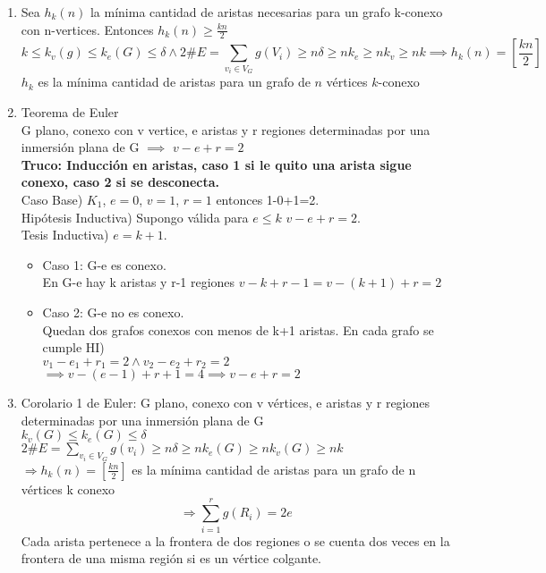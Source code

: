 \documentclass{article}
\begin{document}
\begin{enumerate}
    \item Sea $h_k(n)$ la mínima cantidad de aristas necesarias para un grafo k-conexo con n-vertices. Entonces $h_k(n)\geq\frac{kn}{2}$ \\
    $$k\leq k_v(g)\leq k_e(G)\leq\delta \land 2\#E=\sum_{v_i\in V_G}g(V_i)\geq n\delta\geq nk_e\geq nk_v\geq nk \implies h_k(n)=\left[\frac{kn}{2}\right]$$
    $h_k$ es la mínima cantidad de aristas para un grafo de $n$ vértices $k$-conexo
    
    \item Teorema de Euler \\
    G plano, conexo con v vertice, e aristas y r regiones determinadas por una inmersión plana de G $\implies$ $v-e+r=2$ \\
    \textbf{Truco: Inducción en aristas, caso 1 si le quito una arista sigue conexo, caso 2 si se desconecta.} \\
    Caso Base) $K_1$, $e=0$, $v=1$, $r=1$ entonces 1-0+1=2. \\
    Hipótesis Inductiva) Supongo válida para $e\leq k$ $v - e + r = 2$. \\
    Tesis Inductiva) $e=k+1$. 
    \begin{itemize}
        \item Caso 1: G-e es conexo. \\
    En G-e hay k aristas y r-1 regiones $v - k + r - 1 = v - (k + 1) + r = 2$
        \item Caso 2: G-e no es conexo. \\
    Quedan dos grafos conexos con menos de k+1 aristas. En cada grafo se cumple HI) \\
    $v_1 - e_1 + r_1 = 2 \land v_2 - e_2 + r_2 = 2$ \\
    $\implies v - (e - 1) + r + 1 = 4 \implies v - e + r = 2 $
    \end{itemize}
    
    \item Corolario 1 de Euler: G plano, conexo con v vértices, e aristas y r regiones determinadas por una inmersión plana de G \\
    $k_{v}(G) \leq k_{e}(G) \leq \delta$ $2 \# E=\sum_{v_{i} \in V_{G}} g\left(v_{i}\right) \geq n \delta \geq n k_{e}(G) \geq n k_{v}(G) \geq n k$ $\Rightarrow h_{k}(n)=\left[\frac{k n}{2}\right]$ es la mínima cantidad de aristas para un grafo de n vértices k conexo
    $$
    \Rightarrow \sum_{i=1}^{r} g\left(R_{i}\right)=2 e
    $$
    Cada arista pertenece a la frontera de dos regiones o se cuenta dos veces en la frontera de una misma región si es un vértice colgante.
    

\end{enumerate}
\end{document}
